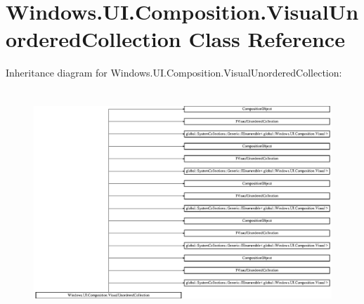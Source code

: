 \hypertarget{class_windows_1_1_u_i_1_1_composition_1_1_visual_unordered_collection}{}\section{Windows.\+U\+I.\+Composition.\+Visual\+Unordered\+Collection Class Reference}
\label{class_windows_1_1_u_i_1_1_composition_1_1_visual_unordered_collection}
Inheritance diagram for Windows.\+U\+I.\+Composition.\+Visual\+Unordered\+Collection\+:\begin{figure}[H]
\begin{center}
\leavevmode
\includegraphics[height=8.468809cm]{class_windows_1_1_u_i_1_1_composition_1_1_visual_unordered_collection}
\end{center}
\end{figure}

